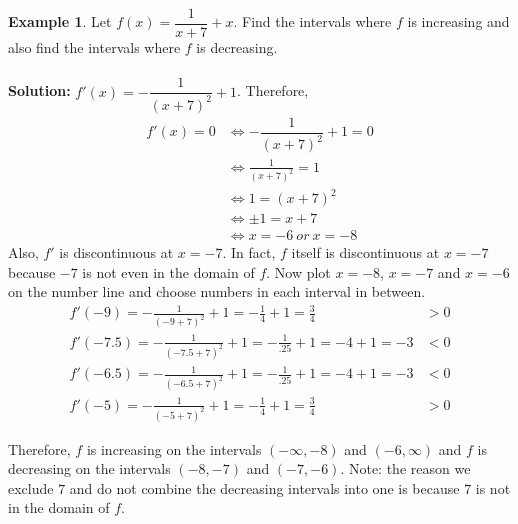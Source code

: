 \documentclass[reqno,psamsfonts]{amsart}
\theoremstyle{definition}
\newtheorem{exmp}[thm]{Example}
\theoremstyle{remark}
\numberwithin{equation}{section}
\begin{document}
\begin{exmp}
Let $f(x) = \dfrac{1}{x+7}+x$. Find the intervals where $f$ is increasing and also find the intervals where $f$ is decreasing. 
\\
\\\textbf{Solution:} $f'(x) = -\dfrac{1}{(x+7)^2}+1$. Therefore, 
\begin{align*}
f'(x) = 0&\iff -\dfrac{1}{(x+7)^2}+1=0\\
&\iff \frac{1}{(x+7)^2}=1\\
&\iff 1 = (x+7)^2\\
&\iff \pm 1=x+7\\
&\iff x=-6\ or\ x = -8
\end{align*}
Also, $f'$ is discontinuous at $x=-7$. In fact, $f$ itself is discontinuous at $x=-7$ because $-7$ is not even in the domain of $f$. Now plot $x=-8$, $x=-7$ and $x=-6$ on the number line and choose numbers in each interval in between. 
\begin{align*}
f'(-9)=-\frac{1}{(-9+7)^2}+1=-\frac{1}{4}+1=\frac{3}{4}&>0\\
f'(-7.5) = -\frac{1}{(-7.5+7)^2}+1=-\frac{1}{.25}+1=-4+1=-3&<0\\
f'(-6.5)=-\frac{1}{(-6.5+7)^2}+1=-\frac{1}{.25}+1=-4+1=-3&<0\\
f'(-5)=-\frac{1}{(-5+7)^2}+1=-\frac{1}{4}+1=\frac{3}{4}&>0
\end{align*}

\begin{center}
\end{center}
Therefore, $f$ is increasing on the intervals $(-\infty, -8)$ and $(-6,\infty)$ and $f$ is decreasing on the intervals $(-8,-7)$ and $(-7,-6)$. Note: the reason we exclude $7$ and do not combine the decreasing intervals into one is because $7$ is not in the domain of $f$. 
\end{exmp}
\end{document}
